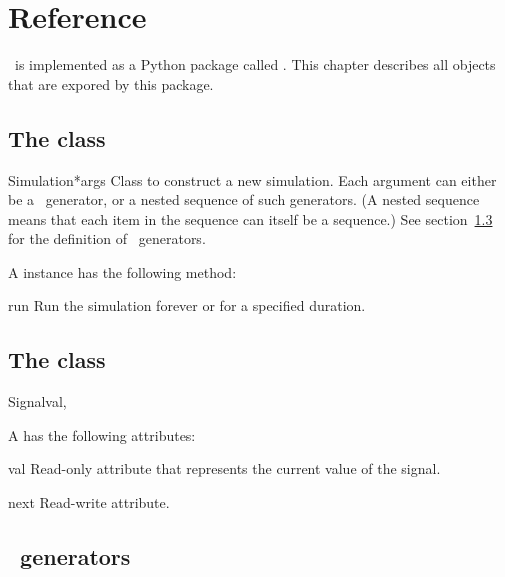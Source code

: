 \chapter{Reference}


\myhdl\ is implemented as a Python package called . This
chapter describes all objects that are expored by this package.

\section{The  class}
\begin{classdesc}{Simulation}{*args}
Class to construct a new simulation. Each argument can either be a
\myhdl\ generator, or a nested sequence of such generators. (A nested
sequence means that each item in the sequence can itself be a
sequence.) See section~\ref{myhdl-generators} for the definition of
\myhdl\ generators.
\end{classdesc}

A  instance has the following method:

\begin{methoddesc}[Simulation]{run}{}
Run the simulation forever or for a specified duration.
\end{methoddesc}

\section{The  class}
\begin{classdesc}{Signal}{val, }

A  has the following attributes:

\begin{memberdesc}[Signal]{val}
Read-only attribute that represents the current value of the signal. 

\end{memberdesc}
\begin{memberdesc}[Signal]{next}
Read-write attribute.

\end{memberdesc}

\end{classdesc}

\section{\myhdl\ generators}
\label{myhdl-generators}


